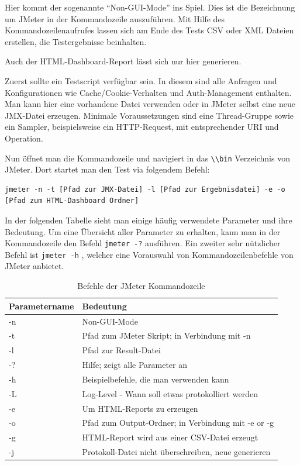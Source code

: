 \documentclass[a4paper,12pt]{article}
\newcommand{\codeInLine}[1]{%
\colorbox{graybackgroundColor}{\lstinline{#1}} %
}
\begin{document}
Hier kommt der sogenannte "`Non-GUI-Mode"' ins Spiel. Dies ist die Bezeichnung um JMeter in der Kommandozeile auszuführen. Mit Hilfe des Kommandozeilenaufrufes lassen sich am Ende des Tests CSV oder XML Dateien erstellen, die Testergebnisse beinhalten. 

Auch der HTML-Dashboard-Report lässt sich nur hier generieren.

Zuerst sollte ein Testscript verfügbar sein. In diesem sind alle Anfragen und Konfigurationen wie Cache/Cookie-Verhalten und Auth-Management enthalten. Man kann hier eine vorhandene Datei verwenden oder in JMeter selbst eine neue JMX-Datei erzeugen. Minimale Voraussetzungen sind eine Thread-Gruppe sowie ein Sampler, beispielsweise ein HTTP-Request, mit entsprechender URI und Operation.

Nun öffnet man die Kommandozeile und navigiert in das \codeInLine{\\bin} Verzeichnis von JMeter. Dort startet man den Test via folgendem Befehl:
\begin{lstlisting}
jmeter -n -t [Pfad zur JMX-Datei] -l [Pfad zur Ergebnisdatei] -e -o [Pfad zum HTML-Dashboard Ordner]
\end{lstlisting} 
In der folgenden Tabelle sieht man einige häufig verwendete Parameter und ihre Bedeutung. Um eine Übersicht aller Parameter zu erhalten, kann man in der Kommandozeile den Befehl \codeInLine{jmeter -?} ausführen. Ein zweiter sehr nützlicher Befehl ist \codeInLine{jmeter -h}, welcher eine Vorauswahl von Kommandozeilenbefehle von JMeter anbietet.
\begin{table}[H]
	\centering
	\begin{tabular}{|l|l|}
		\hline
		\textbf{Parametername} & \textbf{Bedeutung} \\
		\hline
		-n & Non-GUI-Mode \\
		-t & Pfad zum JMeter Skript; in Verbindung mit -n \\
		-l & Pfad zur Result-Datei \\
		-? & Hilfe; zeigt alle Parameter an \\
		-h & Beispielbefehle, die man verwenden kann \\
		-L & Log-Level - Wann soll etwas protokolliert werden \\
		-e & Um HTML-Reports zu erzeugen\\
		-o & Pfad zum Output-Ordner; in Verbindung mit -e or -g \\
		-g & HTML-Report wird aus einer CSV-Datei erzeugt \\ 
		-j & Protokoll-Datei nicht überschreiben, neue generieren \\
		\hline
	\end{tabular}
	\caption[tab_parameter_non_gui_all]{Befehle der JMeter Kommandozeile}
	\label{tab_parameter_non_gui_all}
\end{table}
\end{document}

